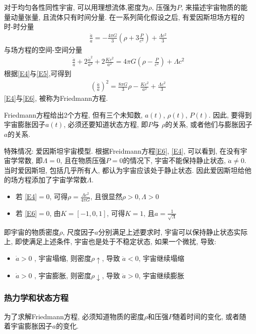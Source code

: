 对于均匀各性同性宇宙, 可以用理想流体,密度为$\rho$, 压强为$P$, 来描述宇宙物质的能量动量张量, 且流体只有时间分量. 在一系列简化假设之后, 有爱因斯坦场方程的时-时分量
\begin{align}
    \frac{\ddot{a}}{a}=-\frac{4\pi G}{3}\left( \rho+3\frac{P}{c^2} \right)+\frac{\Lambda c^2}{3} \label{E4}
\end{align}
与场方程的空间-空间分量
\begin{align}
    \frac{\ddot{a}}{a}+2\frac{\dot{a}^2}{a^2}+2\frac{Kc^2}{a^2}=4\pi G\left( \rho-\frac{P}{c^2} \right) +\Lambda c^2\label{E5}
\end{align}
根据\ref{E4}与\ref{E5},可得到
\begin{align}
    \left( \frac{\dot{a}}{a} \right) ^2=\frac{8\pi G}{3}\rho -\frac{K c^2}{a^2} +\frac{\Lambda c^2}{3}\label{E6}
\end{align}
\ref{E4}与\ref{E6}, 被称为Friedmann方程. 

Friedmann方程给出2个方程, 但有三个未知数, $a(t)$, $\rho(t)$, $P(t)$. 因此, 要得到宇宙膨胀因子$a(t)$, 必须还要知道状态方程, 即$P$与 $\rho$的关系, 或者他们与膨胀因子$a$的关系. 

特殊情况: 爱因斯坦宇宙模型. 根据Freidmann方程\ref{E6}, \ref{E4}, 可以看到, 在没有宇宙学常数, 即$\Lambda=0$, 且在物质压强$P=0$的情况下, 宇宙不能保持静止状态, $\ddot{a}\ne 0$. 当时爱因斯坦, 包括几乎所有人, 都认为宇宙应该处于静止状态. 因此爱因斯坦给他的场方程添加了宇宙学常数$\Lambda$. 
\begin{itemize}\small
    \item 若 \ref{E4}$=0$, 可得$\rho=\frac{\Lambda c^2}{4\pi G}$, 且很显然$\rho > 0, \Lambda>0$
    \item 若 \ref{E6}$=0$, 由$K=[-1,0,1]$, 可得$K=1$, 且$a=\frac{1}{\sqrt{\Lambda}}$
\end{itemize}
即宇宙的物质密度$\rho$, 尺度因子$a$分别满足上述要求时, 宇宙可以保持静止状态实际上, 即使满足上述条件, 宇宙也是处于不稳定状态, 如果一个微扰, 导致: 
\begin{itemize}\small
    \item $\dot{a}>0$ , 宇宙塌缩, 则密度$\rho \uparrow$, 导致 $\ddot{a}<0$, 宇宙继续塌缩
    \item $\dot{a}>0$ , 宇宙膨胀, 则密度$\rho \downarrow$, 导致 $\ddot{a}>0$, 宇宙继续膨胀
\end{itemize}

\subsubsection{热力学和状态方程}
为了求解Friedmann方程, 必须知道物质的密度$\rho$和压强$P$随着时间的变化, 或者随着宇宙膨胀因子$a$的变化.

